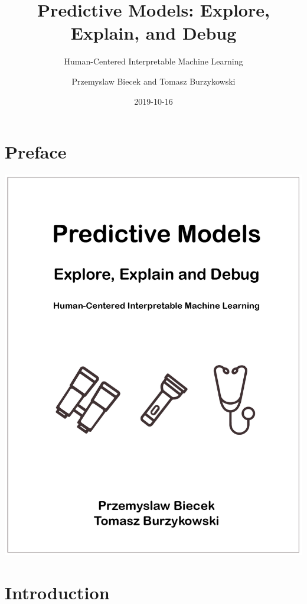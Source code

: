 \documentclass[12pt,]{krantz}
\title{Predictive Models: Explore, Explain, and Debug}
\subtitle{Human-Centered Interpretable Machine Learning}
\author{Przemyslaw Biecek and Tomasz Burzykowski}
\date{2019-10-16}
\begin{document}
\maketitle

{
\hypersetup{linkcolor=black}
\setcounter{tocdepth}{2}
\tableofcontents
}
\listoftables
\listoffigures
\hypertarget{preface}{%
\section*{Preface}\label{preface}}

\begin{center}\includegraphics[width=0.99\linewidth]{figure/front} \end{center}

\hypertarget{introduction}{%
\section{Introduction}\label{introduction}}
\end{document}
